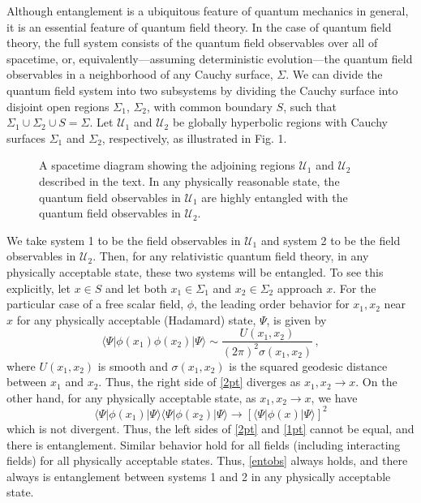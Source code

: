 \documentclass[12pt,nofootinbib,amsmath,amssymb,amsfonts,aps,prd,groupedaddress]{revtex4-1}
\newcommand{\be}{\begin{equation}} \newcommand{\ee}{\end{equation}}
\begin{document}
Although entanglement is a ubiquitous feature of quantum mechanics in general, it is an
essential feature of quantum field theory. In the case of quantum field theory,
the full system consists of the quantum field observables over all of spacetime,
or, equivalently---assuming deterministic evolution---the quantum field
observables in a neighborhood of any Cauchy surface, $\Sigma$. We can divide the
quantum field system into two subsystems by dividing the Cauchy surface into
disjoint open regions $\Sigma_1$, $\Sigma_2$, with common boundary $S$, such
that $\Sigma_1 \cup \Sigma_2 \cup S =\Sigma$.  Let ${\mathcal U}_1$ and
${\mathcal U}_2$ be globally hyperbolic regions with Cauchy surfaces $\Sigma_1$
and $\Sigma_2$, respectively, as illustrated in Fig. 1. 
\begin{figure}[ht]
\centering
{}
\caption{A spacetime diagram showing the adjoining regions ${\mathcal U}_1$ and ${\mathcal U}_2$ described in the text. In any physically reasonable state, the quantum field observables in ${\mathcal U}_1$ are highly entangled with the quantum field observables in ${\mathcal U}_2$.}
\end{figure}
We take system 1 to be
the field observables in ${\mathcal U}_1$ and system 2 to be the field
observables in ${\mathcal U}_2$.  Then, for any relativistic quantum field theory, in any physically acceptable state, these
two systems will be entangled.  To see this 
explicitly, let $x \in S$ and let both $x_1
\in \Sigma_1$ and $x_2 \in \Sigma_2$ approach $x$. For the particular case of a free
scalar field, $\phi$, the leading order
behavior for $x_1, x_2$ near $x$ for any physically acceptable (Hadamard) state,
$\Psi$, is given by
\be \langle \Psi | \phi(x_1) \phi(x_2) | \Psi \rangle \sim \frac{U(x_1,x_2)}{(2
\pi)^2 \sigma(x_1, x_2)} \, , \label{2pt}\ee 
where $U(x_1, x_2)$ is smooth and $\sigma(x_1, x_2)$ is the squared geodesic
distance between $x_1$ and $x_2$. Thus, the right side of \eqref{2pt} diverges as $x_1,
x_2 \to x$. On the other hand, for any physically acceptable state, as $x_1, x_2 \to x$, we have
\be \langle \Psi | \phi(x_1) | \Psi \rangle
\langle \Psi | \phi(x_2) | \Psi \rangle \to \left[\langle \Psi | \phi(x) | \Psi
\rangle\right]^2 \label{1pt} \ee which is not
divergent. 
Thus, the left sides of \eqref{2pt} and \eqref{1pt} cannot be equal, and there is entanglement.
Similar behavior hold for all fields (including
interacting fields) for all physically acceptable states. Thus, \eqref{entobs}
always holds, and there always is entanglement between systems 1 and 2 in any
physically acceptable state.
\end{document}
